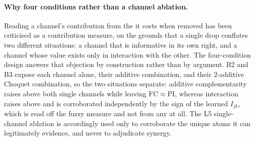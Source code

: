 \paragraph{Why four conditions rather than a channel ablation.}
Reading a channel's contribution from the \auroc{} it costs when removed
has been criticised as a contribution measure, on the grounds that a
single drop conflates two different situations: a channel that is
informative in its own right, and a channel whose value exists only in
interaction with the other.\cite{padegal2025modality}
The four-condition design answers that objection by construction rather
than by argument. B2 and B3 expose each channel alone, \piabmil{} their
additive combination, and \fcmil{} their $2$-additive Choquet
combination, so the two situations separate: additive complementarity
raises \piabmil{} above both single channels while leaving
$\mathrm{FC}\!\approx\!\mathrm{PI}$, whereas interaction raises \fcmil{}
above \piabmil{} and is corroborated independently by the sign of the
learned $I_{jk}$, which is read off the fuzzy measure and not from any
\auroc{} at all. The L5 single-channel ablation is accordingly used only
to corroborate the unique atoms it can legitimately evidence, and never
to adjudicate synergy.

\begin{table}[htbp]
\centering

\caption{\textbf{How each atom of \cref{eq:pid} is read from the model.}
Every atom is mapped to the model-side signature that evidences it, the
directional decision rule on the four training conditions, the
interpretability level(s) that expose it, and the regime it drives. The
signatures are read---not numerically estimated---against the Bertschinger
reference decomposition\cite{bertschinger2014unique}.}
\label{tab:atom_operationalization}
\end{table}

